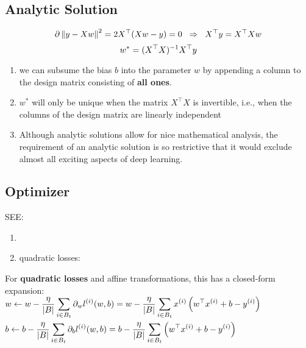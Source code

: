 \subsection*{Analytic Solution \cite{dnn-1}}

\[
    \hfill
    \partial\dnorm{y - Xw}^2 = 2X^\top (Xw - y) = 0
    \hspace{0.2cm}
    \Rightarrow
    \hspace{0.2cm}
    X^\top y = X^\top Xw
    \hfill
\]
\[
    \hfill
    w^\ast = (X^\top X)^{-1}X^\top y
    \hfill
\]

\begin{enumerate}
    \item we can subsume the bias $b$ into the parameter $w$ by appending a column to the design matrix consisting of \textbf{all ones}.

    \item $w^\ast$ will only be unique when the matrix $X^\top X$ is invertible, i.e., when the columns of the design matrix are linearly independent

    \item Although analytic solutions allow for nice mathematical analysis, the requirement of an analytic solution is so restrictive that it would exclude almost all exciting aspects of deep learning.

\end{enumerate}




\subsection*{Optimizer \cite{dnn-1}}
SEE: 
\begin{enumerate}
    \item {}

    \item quadratic losses: 
\end{enumerate}

\vspace{0.5cm}
\noindent
For \textbf{quadratic losses} and affine transformations, this has a closed-form expansion:\\[1ex]
$\begin{aligned}
    &w \leftarrow 
    w - \dfrac{\eta}{\left| B \right|} \displaystyle\sum_{i \in B_t} 
        \partial_{w} l^{(i)}(w,b)
    = w - \dfrac{\eta}{\left| B \right|} \displaystyle\sum_{i \in B_t} 
        x^{(i)} \left(w^\top x^{(i)} + b - y^{(i)}\right) \\
    &b \leftarrow 
    b - \dfrac{\eta}{\left| B \right|} \displaystyle\sum_{i \in B_t} 
        \partial_{b} l^{(i)}(w,b)
    = b - \dfrac{\eta}{\left| B \right|} \displaystyle\sum_{i \in B_t} 
        \left(w^\top x^{(i)} + b - y^{(i)}\right) \\
\end{aligned}$

